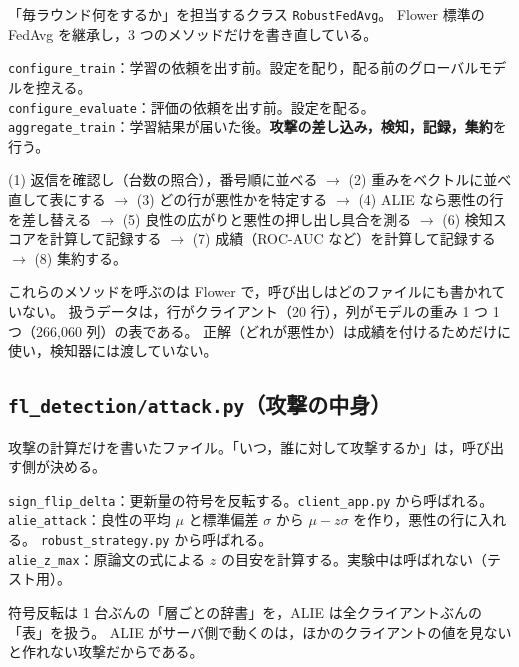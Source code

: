 \documentclass[a4j, dvipdfmx]{jsarticle}  %
\begin{document}
\begin{description}[leftmargin=1.4em, style=nextline]
  \item[役割] 「毎ラウンド何をするか」を担当するクラス \texttt{RobustFedAvg}。
        Flower 標準の FedAvg を継承し，3 つのメソッドだけを書き直している。
  \item[主なメソッド]
        \texttt{configure\_train}：学習の依頼を出す前。設定を配り，配る前のグローバルモデルを控える。\\
        \texttt{configure\_evaluate}：評価の依頼を出す前。設定を配る。\\
        \texttt{aggregate\_train}：学習結果が届いた後。\textbf{攻撃の差し込み，検知，記録，集約}を行う。
  \item[\texttt{aggregate\_train} の流れ]
        (1) 返信を確認し（台数の照合），番号順に並べる $\rightarrow$
        (2) 重みをベクトルに並べ直して表にする $\rightarrow$
        (3) どの行が悪性かを特定する $\rightarrow$
        (4) ALIE なら悪性の行を差し替える $\rightarrow$
        (5) 良性の広がりと悪性の押し出し具合を測る $\rightarrow$
        (6) 検知スコアを計算して記録する $\rightarrow$
        (7) 成績（ROC-AUC など）を計算して記録する $\rightarrow$
        (8) 集約する。
  \item[要点] これらのメソッドを呼ぶのは Flower で，呼び出しはどのファイルにも書かれていない。
        扱うデータは，行がクライアント（20 行），列がモデルの重み 1 つ 1 つ（266{,}060 列）の表である。
        正解（どれが悪性か）は成績を付けるためだけに使い，検知器には渡していない。
\end{description}

\subsection{\texttt{fl\_detection/attack.py}（攻撃の中身）}

\begin{description}[leftmargin=1.4em, style=nextline]
  \item[役割] 攻撃の計算だけを書いたファイル。「いつ，誰に対して攻撃するか」は，呼び出す側が決める。
  \item[主な関数]
        \texttt{sign\_flip\_delta}：更新量の符号を反転する。\texttt{client\_app.py} から呼ばれる。\\
        \texttt{alie\_attack}：良性の平均 $\mu$ と標準偏差 $\sigma$ から $\mu - z\sigma$ を作り，悪性の行に入れる。
        \texttt{robust\_strategy.py} から呼ばれる。\\
        \texttt{alie\_z\_max}：原論文の式による $z$ の目安を計算する。実験中は呼ばれない（テスト用）。
  \item[要点] 符号反転は 1 台ぶんの「層ごとの辞書」を，ALIE は全クライアントぶんの「表」を扱う。
        ALIE がサーバ側で動くのは，ほかのクライアントの値を見ないと作れない攻撃だからである。
\end{description}
\end{document}
